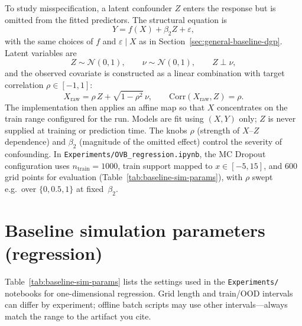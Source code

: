 To study misspecification, a latent confounder $Z$ enters the response but is omitted from the fitted predictors. The structural equation is
\begin{equation}
  Y = f(X) + \beta_2 Z + \varepsilon,
\end{equation}
with the same choices of $f$ and $\varepsilon\mid X$ as in Section~\ref{sec:general-baseline-dgp}. Latent variables are
\begin{equation}
  Z \sim \mathcal{N}(0,1),
  \qquad
  \nu \sim \mathcal{N}(0,1),
  \qquad
  Z \perp \nu,
\end{equation}
and the observed covariate is constructed as a linear combination with target correlation $\rho \in [-1,1]$:
\begin{equation}
  X_{\mathrm{raw}} = \rho\, Z + \sqrt{1-\rho^2}\,\nu,
  \qquad
  \mathrm{Corr}(X_{\mathrm{raw}}, Z) = \rho.
\end{equation}
The implementation then applies an affine map so that $X$ concentrates on the train range configured for the run. Models are fit using $(X,Y)$ only; $Z$ is never supplied at training or prediction time. The knobs $\rho$ (strength of $X$--$Z$ dependence) and $\beta_2$ (magnitude of the omitted effect) control the severity of confounding. In \texttt{Experiments/OVB\_regression.ipynb}, the MC Dropout configuration uses $n_{\mathrm{train}}=1000$, train support mapped to $x\in[-5,15]$, and $600$ grid points for evaluation (Table~\ref{tab:baseline-sim-params}), with $\rho$ swept e.g.\ over $\{0,0.5,1\}$ at fixed~$\beta_2$.

\section{Baseline simulation parameters (regression)}
\label{sec:baseline-sim-params}

Table~\ref{tab:baseline-sim-params} lists the settings used in the \texttt{Experiments/} notebooks for one-dimensional regression. Grid length and train/OOD intervals can differ by experiment; offline batch scripts may use other intervals---always match the range to the artifact you cite.

